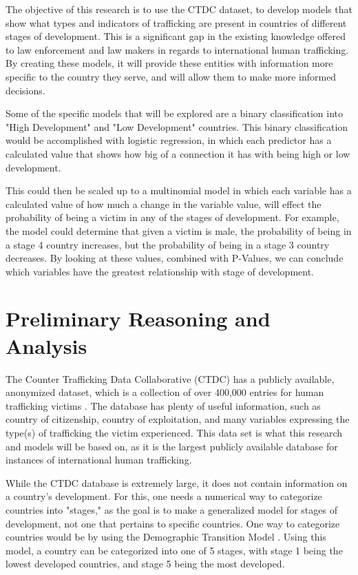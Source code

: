 \documentclass{article} %
\begin{document}
The objective of this research is to use the CTDC dataset, to develop models that show what types and indicators of trafficking are present in countries of different stages of development. This is a significant gap in the existing knowledge offered to law enforcement and law makers in regards to international human trafficking. By creating these models, it will provide these entities with information more specific to the country they serve, and will allow them to make more informed decisions.

Some of the specific models that will be explored are a binary classification into "High Development" and "Low Development" countries. This binary classification would be accomplished with logistic regression, in which each predictor has a calculated value that shows how big of a connection it has with being high or low development. 

This could then be scaled up to a multinomial model in which each variable has a calculated value of how much a change in the variable value, will effect the probability of being a victim in any of the stages of development. For example, the model could determine that given a victim is male, the probability of being in a stage 4 country increases, but the probability of being in a stage 3 country decreases. By looking at these values, combined with P-Values, we can conclude which variables have the greatest relationship with stage of development.

\section{Preliminary Reasoning and Analysis}

The Counter Trafficking Data Collaborative (CTDC) has a publicly available, anonymized dataset, which is a collection of over 400,000 entries for human trafficking victims \parencite{CTDC}. The database has plenty of useful information, such as country of citizenship, country of exploitation, and many variables expressing the type(s) of trafficking the victim experienced. This data set is what this research and models will be based on, as it is the largest publicly available database for instances of international human trafficking.

While the CTDC database is extremely large, it does not contain information on a country's development. For this, one needs a numerical way to categorize countries into "stages," as the goal is to make a generalized model for stages of development, not one that pertains to specific countries. One way to categorize countries would be by using the Demographic Transition Model \parencite{bongaarts2009}. Using this model, a country can be categorized into one of 5 stages, with stage 1 being the lowest developed countries, and stage 5 being the most developed.
\end{document}
